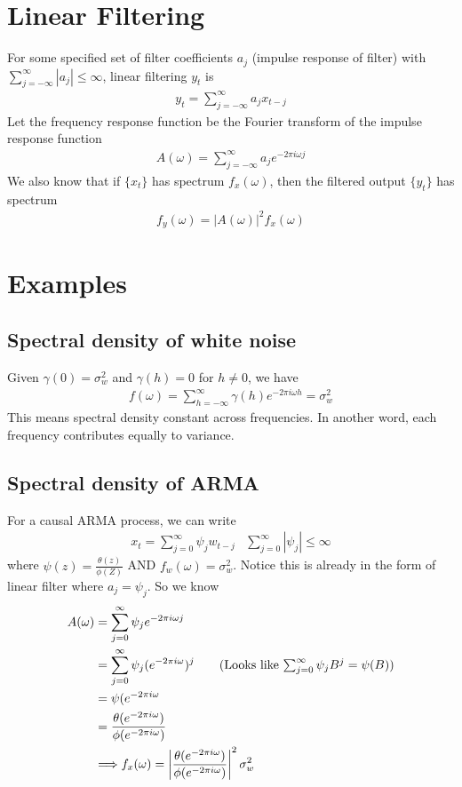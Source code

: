 \section{Linear Filtering} 
For some specified set of filter coefficients $a_j$ (impulse response of filter) with $\sum_{j=-\infty}^{\infty} |a_j| \leq \infty$, linear filtering $y_t$ is
    \begin{align*}
        y_t = \sum_{j=-\infty}^\infty a_j x_{t-j}
    \end{align*}
Let the frequency response function be the Fourier transform of the impulse response function
    \begin{align*}
        A(\omega) = \sum_{j=-\infty}^\infty a_j e^{-2\pi i \omega j}
    \end{align*}
We also know that if $\{ x_t \}$ has spectrum $f_x(\omega)$, then the filtered output $\{ y_t \}$ has spectrum 
    \begin{align*}
        f_y(\omega) = |A(\omega)|^2 f_x(\omega)
    \end{align*}
    
    
\section{Examples} 
\subsection{Spectral density of white noise} 
Given $\gamma(0) = \sigma_w^2$ and $\gamma(h) = 0$ for $h \neq 0$, we have 
    \begin{align*}
        f(\omega) = \sum_{h=-\infty}^\infty \gamma(h) e^{-2\pi i \omega h} = \sigma_w^2
    \end{align*}
This means spectral density constant across frequencies. In another word, each frequency contributes equally to variance. 

\subsection{Spectral density of ARMA} 
For a causal ARMA process, we can write 
    \begin{align*}
        x_t = \sum_{j=0}^\infty \psi_j w_{t-j} & \sum_{j=0}^\infty |\psi_j| \leq \infty 
    \end{align*}
where $\psi(z) = \frac{\theta(z)}{\phi(Z)}$ AND $f_w(\omega) = \sigma_w^2$. Notice this is already in the form of linear filter where $a_j = \psi_j$. So we know 
    \begin{align*}
        A(\omega) &= \sum_{j=0}^\infty \psi_j e^{-2\pi i \omega j } \\
        & = \sum_{j=0}^\infty \psi_j (e^{-2\pi i \omega}) ^ j \tag{Looks like $\sum_{j=0}^\infty \psi_j B^j = \psi(B)$} \\
        & = \psi(e^{-2\pi i \omega} \\
        & = \frac{\theta(e^{-2\pi i \omega})}{\phi(e^{-2\pi i \omega})} \\
        & \Longrightarrow f_x(\omega) = \abs{\frac{\theta(e^{-2\pi i \omega})}{\phi(e^{-2\pi i \omega})}}^2\sigma_w^2
    \end{align*}
    
